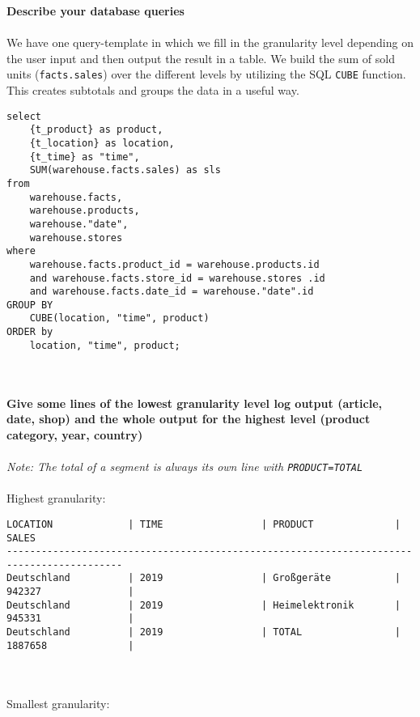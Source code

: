 \documentclass[a4paper,english,abstract=on]{scrartcl}
\begin{document}
\newpage
\textbf{Describe your database queries}
~\\~\\
We have one query-template in which we fill in the granularity level depending on the user input and then output the result in a table. We build the sum of sold units (\texttt{facts.sales}) over the different levels by utilizing the SQL \texttt{CUBE} function. This creates subtotals and groups the data in a useful way.
\begin{lstlisting}
select 
	{t_product} as product,
	{t_location} as location,
	{t_time} as "time",
	SUM(warehouse.facts.sales) as sls 
from 
	warehouse.facts, 
	warehouse.products, 
	warehouse."date", 
	warehouse.stores 
where 
	warehouse.facts.product_id = warehouse.products.id 
	and warehouse.facts.store_id = warehouse.stores .id 
	and warehouse.facts.date_id = warehouse."date".id 
GROUP BY
	CUBE(location, "time", product)
ORDER by
	location, "time", product;
\end{lstlisting}
~\\~\\
\textbf{Give some lines of the lowest granularity level log output (article, date, shop) and the whole output for the highest level (product category, year, country)}
~\\~\\
\textit{Note: The total of a segment is always its own line with \texttt{PRODUCT=TOTAL}}
~\\~\\
Highest granularity:
\begin{lstlisting}
LOCATION             | TIME                 | PRODUCT              | SALES               
------------------------------------------------------------------------------------------
Deutschland          | 2019                 | Großgeräte           | 942327               | 
Deutschland          | 2019                 | Heimelektronik       | 945331               | 
Deutschland          | 2019                 | TOTAL                | 1887658              | 
\end{lstlisting}
~\\~\\
Smallest granularity:
\end{document}
